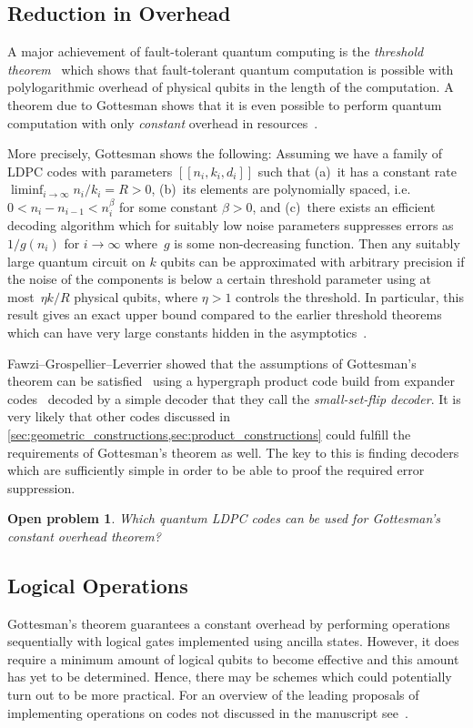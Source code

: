 \documentclass[amsmath, amssymb, floatfix, reprint, twocolumn, notitlepage, 10pt]{revtex4-1}
\newcommand{\change}{}
\newtheorem*{oproblem}{Open problem}
\begin{document}
\subsection{Reduction in Overhead}\label{sec:overhead_reduction}
A major achievement of fault-tolerant quantum computing is the \emph{threshold theorem}~\cite{kitaev1997quantum,knill1998resilient,aharonov2008fault} which shows that fault-tolerant quantum computation is possible with polylogarithmic overhead of physical qubits in the length of the computation.
A theorem due to Gottesman shows that it is even possible to perform quantum computation with only \emph{constant} overhead in resources~\cite{gottesman2014overhead}.

{\change
More precisely, Gottesman shows the following:
Assuming we have a family of LDPC codes with parameters $[[n_i,k_i,d_i]]$ such that (a)~it has a constant rate $\liminf_{i\rightarrow \infty} n_i/k_i = R > 0$, (b)~its elements are polynomially spaced, i.e. $0<n_i-n_{i-1} < n_i^\beta$ for some constant $\beta>0$, and (c)~there exists an efficient decoding algorithm which for suitably low noise parameters suppresses errors as $1/g(n_i)$ for $i \rightarrow \infty$ where~$g$ is some non-decreasing function.
Then any suitably large quantum circuit on $k$ qubits can be  approximated with arbitrary precision if the noise of the components is below a certain threshold parameter using at most~$\eta k/R$ physical qubits, where $\eta >1$ controls the threshold.
In particular, this result gives an exact upper bound compared to the earlier threshold theorems which can have very large constants hidden in the asymptotics~\cite{knill2005quantum}.
%
%
}

Fawzi--Grospellier--Leverrier showed that the assumptions of Gottesman's theorem can be satisfied~\cite{fawzi2018constant} using a hypergraph product code build from expander codes~\cite{leverrier2015quantum} decoded by a simple decoder that they call the \emph{small-set-flip decoder}.
It is very likely that other codes discussed in \cref{sec:geometric_constructions,sec:product_constructions} could fulfill the requirements of Gottesman's theorem as well.
The key to this is finding decoders which are sufficiently simple in order to be able to proof the required error suppression.
\begin{oproblem}
Which quantum LDPC codes can be used for Gottesman's constant overhead theorem?
\end{oproblem}

\subsection{Logical Operations}
Gottesman's theorem guarantees a constant overhead by performing operations sequentially with logical gates implemented using ancilla states.
However, it does require a minimum amount of logical qubits to become effective and this amount has yet to be determined.
Hence, there may be schemes which could potentially turn out to be more practical.
For an overview of the leading proposals of implementing operations on codes not discussed in the manuscript see~\cite{campbell2017roads}.
\end{document}
